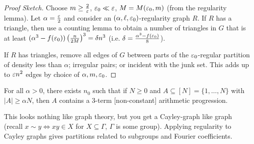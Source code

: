 \documentclass[main.tex]{subfiles}
\begin{document}
\begin{proof}[Proof Sketch]
  Choose $m\geq\frac{2}{\varepsilon}$, $\varepsilon_0\ll\varepsilon$, $M = M(\varepsilon_0,m)$
  (from the regularity lemma).
  Let $\alpha = \frac{\varepsilon}{2}$ and consider an $(\alpha,\ell,\varepsilon_0)$-regularity
  graph $R$.
  If $R$ has a triangle, then use a counting lemma to obtain a number of
  triangles in $G$ that is at least
  $(\alpha^3 - f(\varepsilon_0))\left(\frac{n}{2M}\right)^3 = \delta n^3$
  (i.e. $\delta = \frac{\alpha^3-f(\varepsilon_0)}{8}$).

  If $R$ has triangles, remove all edges of $G$ between parts of the
  $\varepsilon_0$-regular partition of density less than $\alpha$; irregular pairs; or
  incident with the junk set.
  This adds up to $\varepsilon n^2$ edges by choice of $\alpha, m, \varepsilon_0$.
\end{proof}
\begin{theorem}[Roth '53]
  For all $\alpha > 0$, there exists $n_0$ such that if $N\geq 0$ and
  $A\subseteq [N] = \{1,\ldots,N\}$ with $|A|\geq\alpha N$, then $A$
  contains a 3-term [non-constant] arithmetic progression.
\end{theorem}
This looks nothing like graph theory, but you get a Cayley-graph like graph
(recall $x\sim y\iff xy\in X$ for $X\subseteq\Gamma$, $\Gamma$ is some group).
Applying regularity to Cayley graphs gives partitions related to subgroups
and Fourier coefficients.
\end{document}
